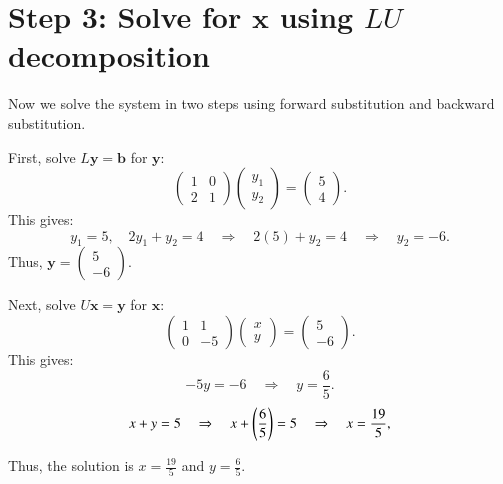 \documentclass[journal]{IEEEtran}
\begin{document}
\section*{Step 3: Solve for \(\mathbf{x}\) using \(LU\) decomposition}
Now we solve the system in two steps using forward substitution and backward substitution.

First, solve \(L \mathbf{y} = \mathbf{b}\) for \(\mathbf{y}\):
\[
\begin{pmatrix} 1 & 0 \\ 2 & 1 \end{pmatrix} \begin{pmatrix} y_1 \\ y_2 \end{pmatrix} = \begin{pmatrix} 5 \\ 4 \end{pmatrix}.
\]
This gives:
\[
y_1 = 5, \quad 2y_1 + y_2 = 4 \quad \Rightarrow \quad 2(5) + y_2 = 4 \quad \Rightarrow \quad y_2 = -6.
\]
Thus, \(\mathbf{y} = \begin{pmatrix} 5 \\ -6 \end{pmatrix}\).

Next, solve \(U \mathbf{x} = \mathbf{y}\) for \(\mathbf{x}\):
\[
\begin{pmatrix} 1 & 1 \\ 0 & -5 \end{pmatrix} \begin{pmatrix} x \\ y \end{pmatrix} = \begin{pmatrix} 5 \\ -6 \end{pmatrix}.
\]
This gives:
\[
-5y = -6 \quad \Rightarrow \quad y = \frac{6}{5}.
\]
\[
x + y = 5 \quad \Rightarrow \quad x + \left(\frac{6}{5}\right) = 5 \quad \Rightarrow \quad x = \frac{19}{5},
\]

Thus, the solution is \(x = \frac{19}{5}\) and \(y = \frac{6}{5}\).
\end{document}

